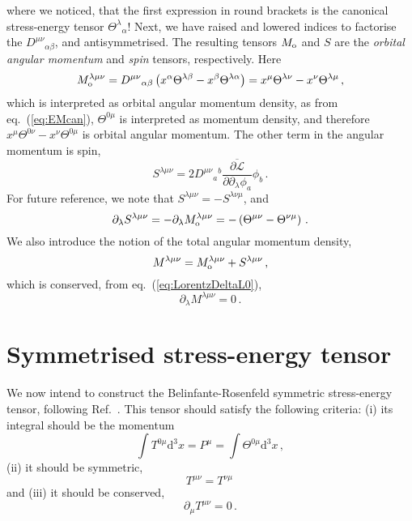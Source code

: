 \documentclass[a4paper,12pt]{article}
\def\d{\mathrm{d}}
\def\lag{{\mathcal{L}}}
\begin{document}
where we noticed, that the first expression in round brackets is the canonical stress-energy tensor $\Theta^\lambda{}_\alpha$! Next, we have raised and lowered indices to factorise the $D^{\mu\nu}{}_{\alpha\beta}$, and antisymmetrised. The resulting tensors $M_{\rm o}$ and $S$ are the \emph{orbital angular momentum} and \emph{spin} tensors, respectively. Here
\begin{equation}\label{eq:OrbAM}
 M_{\rm o}^{\lambda\mu\nu} = D^{\mu\nu}{}_{\alpha\beta}\left(x^\alpha\Theta^{\lambda\beta}-x^\beta\Theta^{\lambda\alpha}\right) = x^\mu \Theta^{\lambda\nu} - x^\nu\Theta^{\lambda\mu}\,,
\end{equation}
which is interpreted as orbital angular momentum density, as from eq.\ (\ref{eq:EMcan}), $\Theta^{0\mu}$ is interpreted as momentum density, and therefore $x^\mu\Theta^{0\nu}- x^\nu\Theta^{0\mu}$ is orbital angular momentum. The other term in the angular momentum is spin,
\begin{equation}\label{eq:SpinAM}
 S^{\lambda\mu\nu} = 2D^{\mu\nu}{}_a{}^b \overline{\frac{\partial\lag}{\partial\partial_\lambda\phi_a}}\phi_b\,.
\end{equation}
For future reference, we note that $S^{\lambda\mu\nu}=-S^{\lambda\nu\mu}$,
and
\begin{equation}\label{eq:DivSAM}
 \partial_\lambda S^{\lambda\mu\nu} =-\partial_\lambda M_{\rm o}^{\lambda\mu\nu}= 
 -\left( \Theta^{\mu\nu} - \Theta^{\nu\mu}\right)\,.
\end{equation}
We also introduce the notion of the total angular momentum density,
\begin{equation}\label{eq:AM}
 M^{\lambda\mu\nu} = M_{\rm o}^{\lambda\mu\nu}+S^{\lambda\mu\nu}\,,
\end{equation}
which is conserved, from eq.\ (\ref{eq:LorentzDeltaL0}),
\begin{equation}\label{eq:AMcons}
\partial_\lambda M^{\lambda\mu\nu} = 0\,.
\end{equation}



\section{Symmetrised stress-energy tensor}
We now intend to construct the Belinfante-Rosenfeld symmetric stress-energy tensor, following Ref.\ \cite{wentzel}. This tensor should satisfy the following criteria: (i) its integral should be the momentum
\begin{equation}\label{eq:BRc1}
 \int T^{0\mu}\d^3 x = P^\mu = \int \Theta^{0\mu} \d^3 x\,,
\end{equation}
(ii) it should be symmetric,
\begin{equation}\label{eq:BRc2}
 T^{\mu\nu} = T^{\nu\mu}\,
\end{equation}
and (iii) it should be conserved,
\begin{equation}\label{eq:BRc3}
 \partial_\mu T^{\mu\nu} = 0\,.
\end{equation}
\end{document}

